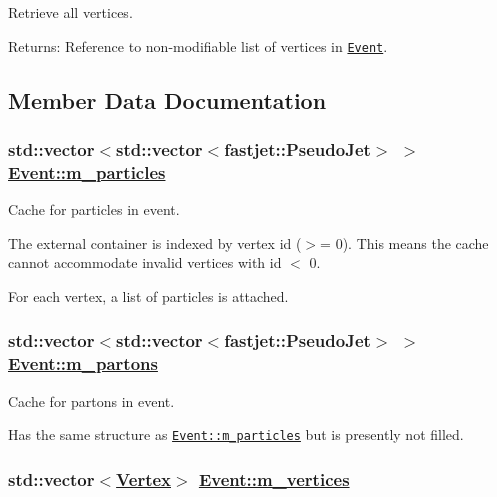 Retrieve all vertices. 

\begin{Desc}
\item[Returns:]Reference to non-modifiable list of vertices in {\tt \hyperlink{classEvent}{Event}}. \end{Desc}


\subsection{Member Data Documentation}
\hypertarget{classEvent_9d70f2f173bbb01fbd90e15860697a18}{
\subsubsection[m\_\-particles]{\setlength{\rightskip}{0pt plus 5cm}std::vector$<$std::vector$<$fastjet::Pseudo\-Jet$>$ $>$ \hyperlink{classEvent_9d70f2f173bbb01fbd90e15860697a18}{Event::m\_\-particles}}}
\label{classEvent_9d70f2f173bbb01fbd90e15860697a18}


Cache for particles in event. 

The external container is indexed by vertex id ($>$= 0). This means the cache cannot accommodate invalid vertices with id $<$ 0.

For each vertex, a list of particles is attached. \hypertarget{classEvent_154cfb0e8a14e418e1eae7ccdf99245d}{
\subsubsection[m\_\-partons]{\setlength{\rightskip}{0pt plus 5cm}std::vector$<$std::vector$<$fastjet::Pseudo\-Jet$>$ $>$ \hyperlink{classEvent_154cfb0e8a14e418e1eae7ccdf99245d}{Event::m\_\-partons}}}
\label{classEvent_154cfb0e8a14e418e1eae7ccdf99245d}


Cache for partons in event. 

Has the same structure as {\tt \hyperlink{classEvent_9d70f2f173bbb01fbd90e15860697a18}{Event::m\_\-particles}} but is presently not filled. \hypertarget{classEvent_9698c3f6d91d9571686295626049ac9c}{
\subsubsection[m\_\-vertices]{\setlength{\rightskip}{0pt plus 5cm}std::vector$<$\hyperlink{classVertex}{Vertex}$>$ \hyperlink{classEvent_9698c3f6d91d9571686295626049ac9c}{Event::m\_\-vertices}}}
\label{classEvent_9698c3f6d91d9571686295626049ac9c}


